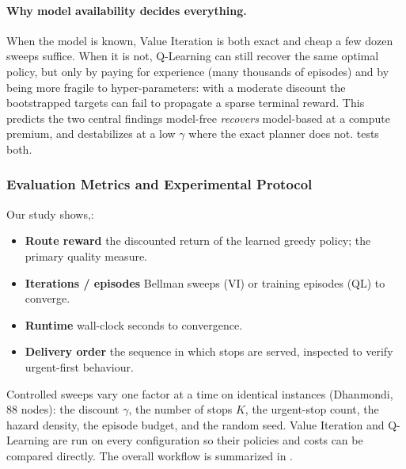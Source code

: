 \documentclass{ai-lab-report}
\begin{document}
\paragraph{Why model availability decides everything.}
When the model is known, Value Iteration is both exact and cheap a few dozen sweeps suffice. When it is not, Q-Learning can still recover the same optimal policy, but only by paying for experience (many thousands of episodes) and by being more fragile to hyper-parameters: with a moderate discount the bootstrapped targets can fail to propagate a sparse terminal reward. This predicts the two central findings model-free \emph{recovers} model-based at a compute premium, and destabilizes at a low $\gamma$ where the exact planner does not.  tests both.

\subsubsection{Evaluation Metrics and Experimental Protocol}
Our study shows,:
\begin{itemize}[leftmargin=1.4em,itemsep=2pt,topsep=2pt]
  \item \textbf{Route reward}   the discounted return of the learned greedy policy; the primary quality measure.
  \item \textbf{Iterations / episodes}   Bellman sweeps (VI) or training episodes (QL) to converge.
  \item \textbf{Runtime}   wall-clock seconds to convergence.
  \item \textbf{Delivery order}   the sequence in which stops are served, inspected to verify urgent-first behaviour.
\end{itemize}

Controlled sweeps vary one factor at a time on identical instances (Dhanmondi, $88$ nodes): the discount $\gamma$, the number of stops $K$, the urgent-stop count, the hazard density, the episode budget, and the random seed. Value Iteration and Q-Learning are run on every configuration so their policies and costs can be compared directly. The overall workflow is summarized in .
\end{document}
